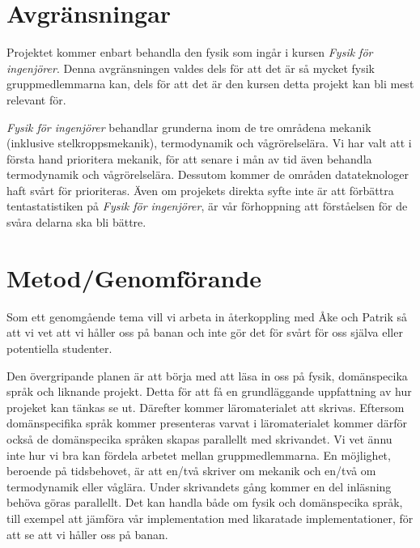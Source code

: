 \documentclass[12pt,a4paper]{article}
\begin{document}
\section{Avgränsningar}

Projektet kommer enbart behandla den fysik som ingår i kursen \textit{Fysik för ingenjörer}. Denna avgränsningen valdes dels för att det är så mycket fysik gruppmedlemmarna kan, dels för att det är den kursen detta projekt kan bli mest relevant för.

\textit{Fysik för ingenjörer} behandlar grunderna inom de tre områdena mekanik (inklusive stelkroppsmekanik), termodynamik och vågrörelselära. Vi har valt att i första hand prioritera mekanik, för att senare i mån av tid även behandla termodynamik och vågrörelselära. Dessutom kommer de områden datateknologer haft svårt för prioriteras. Även om projekets direkta syfte inte är att förbättra tentastatistiken på \textit{Fysik för ingenjörer}, är vår förhoppning att förståelsen för de svåra delarna ska bli bättre.





\section{Metod/Genomförande}

Som ett genomgående tema vill vi arbeta in återkoppling med Åke och Patrik så att vi vet att vi håller oss på banan och inte gör det för svårt för oss själva eller potentiella studenter.

Den övergripande planen är att börja med att läsa in oss på fysik, domänspecika språk och liknande projekt. Detta för att få en grundläggande uppfattning av hur projeket kan tänkas se ut. Därefter kommer läromaterialet att skrivas. Eftersom domänspecifika språk kommer presenteras varvat i läromaterialet kommer därför också de domänspecika språken skapas parallellt med skrivandet. Vi vet ännu inte hur vi bra kan fördela arbetet mellan gruppmedlemmarna. En möjlighet, beroende på tidsbehovet, är att en/två skriver om mekanik och en/två om termodynamik eller våglära. Under skrivandets gång kommer en del inläsning behöva göras parallellt. Det kan handla både om fysik och domänspecika språk, till exempel att jämföra vår implementation med likaratade implementationer, för att se att vi håller oss på banan.
\end{document}
